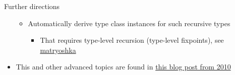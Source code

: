 \documentclass[english]{beamer}
\newenvironment{lyxcode}
   {\par\begin{list}{}{
     \setlength{\rightmargin}{\leftmargin}
     \setlength{\listparindent}{0pt}%
     \raggedright
     \setlength{\itemsep}{0pt}
     \setlength{\parsep}{0pt}
     \normalfont\ttfamily}%
    \def\{{\char`\{}
    \def\}{\char`\}}
    \def\textasciitilde{\char`\~}
    \item[]}
   {\end{list}}
\begin{document}
\begin{frame}{Further directions}
\begin{itemize}
\begin{itemize}
\begin{itemize}
\begin{lyxcode}
\end{lyxcode}
\end{itemize}
\item Automatically derive type class instances for such recursive types
\begin{itemize}
\item That requires type-level recursion (type-level fixpoints), see \href{https://github.com/slamdata/matryoshka}{matryoshka}
\end{itemize}
\end{itemize}
\item This and other advanced topics are found in \href{https://apocalisp.wordpress.com/2010/06/08/type-level-programming-in-scala/}{this blog post from 2010}
\end{itemize}
\end{frame}
\end{document}
